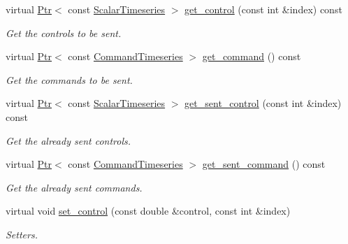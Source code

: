 \begin{DoxyCompactItemize}
virtual \hyperlink{classblmc__drivers_1_1MotorBoardInterface_a6a733b7ed7a3a96f6b0712b6bb5307f8}{Ptr}$<$ const \hyperlink{classblmc__drivers_1_1MotorBoardInterface_a14e237254ba495a66091ea3a3a33fa75}{Scalar\+Timeseries} $>$ \hyperlink{classblmc__drivers_1_1CanBusMotorBoard_a2a1b44b08e57cd112957a33ceb97ebb4}{get\+\_\+control} (const int \&index) const
\begin{DoxyCompactList}\small\item\em Get the controls to be sent. \end{DoxyCompactList}\item 
virtual \hyperlink{classblmc__drivers_1_1MotorBoardInterface_a6a733b7ed7a3a96f6b0712b6bb5307f8}{Ptr}$<$ const \hyperlink{classblmc__drivers_1_1MotorBoardInterface_ae2afe94a023d9f08a4c689e9b7660f15}{Command\+Timeseries} $>$ \hyperlink{classblmc__drivers_1_1CanBusMotorBoard_ac7adb4e5074229bb38e1c288702321e4}{get\+\_\+command} () const
\begin{DoxyCompactList}\small\item\em Get the commands to be sent. \end{DoxyCompactList}\item 
virtual \hyperlink{classblmc__drivers_1_1MotorBoardInterface_a6a733b7ed7a3a96f6b0712b6bb5307f8}{Ptr}$<$ const \hyperlink{classblmc__drivers_1_1MotorBoardInterface_a14e237254ba495a66091ea3a3a33fa75}{Scalar\+Timeseries} $>$ \hyperlink{classblmc__drivers_1_1CanBusMotorBoard_aa71ed313381440d9c2af00c5a13d6faa}{get\+\_\+sent\+\_\+control} (const int \&index) const
\begin{DoxyCompactList}\small\item\em Get the already sent controls. \end{DoxyCompactList}\item 
virtual \hyperlink{classblmc__drivers_1_1MotorBoardInterface_a6a733b7ed7a3a96f6b0712b6bb5307f8}{Ptr}$<$ const \hyperlink{classblmc__drivers_1_1MotorBoardInterface_ae2afe94a023d9f08a4c689e9b7660f15}{Command\+Timeseries} $>$ \hyperlink{classblmc__drivers_1_1CanBusMotorBoard_a5025602eac7b8c4ca1b2f5602e1a6640}{get\+\_\+sent\+\_\+command} () const
\begin{DoxyCompactList}\small\item\em Get the already sent commands. \end{DoxyCompactList}\item 
virtual void \hyperlink{classblmc__drivers_1_1CanBusMotorBoard_a8dbd787fcfc25d68d5443e2f0bf21f64}{set\+\_\+control} (const double \&control, const int \&index)
\begin{DoxyCompactList}\small\item\em Setters. \end{DoxyCompactList}\item 

\end{DoxyCompactItemize}
